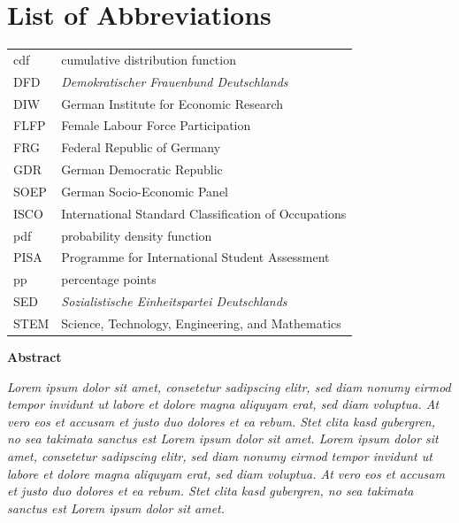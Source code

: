 \documentclass[a4paper, oneside, hyperfootnotes = false]{article}
\begin{document}
{{
{}
\section*{List of Abbreviations}
\noindent\begin{tabular}{@{}ll}
	cdf & cumulative distribution function \\
	DFD & \emph{Demokratischer Frauenbund Deutschlands} \\
    DIW & German Institute for Economic Research \\
    FLFP & Female Labour Force Participation \\
    FRG & Federal Republic of Germany \\
    GDR & German Democratic Republic \\
    SOEP & German Socio-Economic Panel \\
    ISCO & International Standard Classification of Occupations \\
    pdf & probability density function \\
    PISA & Programme for International Student Assessment \\
    pp & percentage points \\
    SED & \emph{Sozialistische Einheitspartei Deutschlands} \\
    STEM & Science, Technology, Engineering, and Mathematics
\end{tabular}

\newpage

\begin{center}
{\large\bfseries Abstract}

\vspace{5mm}

\parbox{400pt}{
    \emph{\noindent Lorem ipsum dolor sit amet, consetetur sadipscing elitr, sed diam nonumy eirmod tempor invidunt ut labore et dolore magna aliquyam erat, sed diam voluptua. At vero eos et accusam et justo duo dolores et ea rebum. Stet clita kasd gubergren, no sea takimata sanctus est Lorem ipsum dolor sit amet. Lorem ipsum dolor sit amet, consetetur sadipscing elitr, sed diam nonumy eirmod tempor invidunt ut labore et dolore magna aliquyam erat, sed diam voluptua. At vero eos et accusam et justo duo dolores et ea rebum. Stet clita kasd gubergren, no sea takimata sanctus est Lorem ipsum dolor sit amet.
    }
}

\end{center}

}%

}
\end{document}
